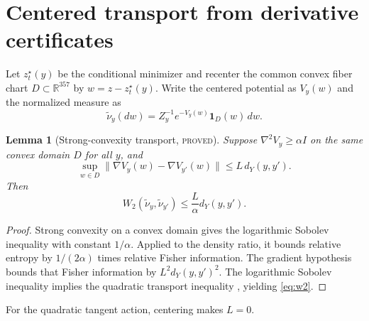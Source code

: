\documentclass[11pt]{article}
\newcommand{\proved}{\textcolor{provedgreen}{\textsc{proved}}}
\newcommand{\R}{\mathbb R}
\newcommand{\ind}{\mathbf 1}
\newtheorem{lemma}[definition]{Lemma}
\theoremstyle{remark}
\begin{document}
\section{Centered transport from derivative certificates}

Let $z_t^\star(y)$ be the conditional minimizer and recenter the common convex
fiber chart $D\subset\R^{357}$ by $w=z-z_t^\star(y)$.  Write the centered
potential as $V_y(w)$ and the normalized measure as
\[
 \widetilde\nu_y(dw)=Z_y^{-1}e^{-V_y(w)}\ind_D(w)\,dw.
\]

\begin{lemma}[Strong-convexity transport, \proved]\label{lem:transport}
Suppose $\nabla^2V_y\ge\alpha I$ on the same convex domain $D$ for all $y$, and
\[
 \sup_{w\in D}\|\nabla V_y(w)-\nabla V_{y'}(w)\|
 \le L\,d_Y(y,y').
\]
Then
\begin{equation}\label{eq:w2}
 W_2(\widetilde\nu_y,\widetilde\nu_{y'})
 \le\frac{L}{\alpha}d_Y(y,y').
\end{equation}
\end{lemma}
\begin{proof}
Strong convexity on a convex domain gives the logarithmic Sobolev inequality
with constant $1/\alpha$.  Applied to the density ratio, it bounds relative
entropy by $1/(2\alpha)$ times relative Fisher information.  The gradient
hypothesis bounds that Fisher information by $L^2d_Y(y,y')^2$.  The
logarithmic Sobolev inequality implies the quadratic transport inequality
\cite{OttoVillani}, yielding \eqref{eq:w2}.
\end{proof}

For the quadratic tangent action, centering makes $L=0$.
\end{document}
